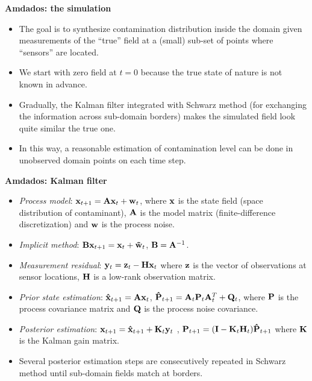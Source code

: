 \documentclass[12pt]{beamer}
\newcommand{\myTitle}{\rmfamily\bfseries}
\begin{document}
\begin{frame}{\myTitle Amdados: the simulation}
\begin{itemize}
\item The goal is to synthesize contamination distribution inside the domain given measurements of the ``true'' field at a (small) sub-set of points where ``sensors'' are located.
\item We start with zero field at $t=0$ because the true state of nature is not known in advance.
\item Gradually, the Kalman filter integrated with Schwarz method (for exchanging the information across sub-domain borders) makes the simulated field look quite similar the true one.
\item In this way, a reasonable estimation of contamination level can be done in unobserved domain points on each time step.
\end{itemize}
\end{frame}

\begin{frame}{\myTitle Amdados: Kalman filter}
\begin{itemize}
\item \textit{Process model}: ${\bf x}_{t+1} = {\bf A}{\bf x}_t + {\bf w}_t$,  where ${\bf x}$ is the state field (space distribution of contaminant), ${\bf A}$ is the model matrix (finite-difference discretization) and ${\bf w}$ is the process noise.
\item \textit{Implicit method}:  ${\bf B}{\bf x}_{t+1} = {\bf x}_t + {\bf\tilde w}_t$, ${\bf B} = {\bf A}^{-1}$.
\item \textit{Measurement residual}: ${\bf y}_t = {\bf z}_t - {\bf H}{\bf x}_t$ where ${\bf z}$ is the vector of observations at sensor locations, ${\bf H}$ is a low-rank observation matrix.
\item \textit{Prior state estimation}:  ${\bf\hat x}_{t+1} = {\bf A}{\bf x}_t$,  ${\bf\hat P}_{t+1}  = {\bf A}_t {\bf P}_t {\bf A}_t^T + {\bf Q}_t$,  where ${\bf P}$ is the process covariance matrix and ${\bf Q}$ is the process noise covariance.
\item \textit{Posterior estimation}:  ${\bf x}_{t+1} = {\bf\hat x}_{t+1} + {\bf K}_t {\bf y}_t$ ,  ${\bf P}_{t+1} = ({\bf I} - {\bf K}_t {\bf H}_t) {\bf\hat P}_{t+1}$ where ${\bf K}$ is the Kalman gain matrix.
\item Several posterior estimation steps are consecutively repeated in Schwarz method until sub-domain fields match at borders.
\end{itemize}
\end{frame}
\end{document}
